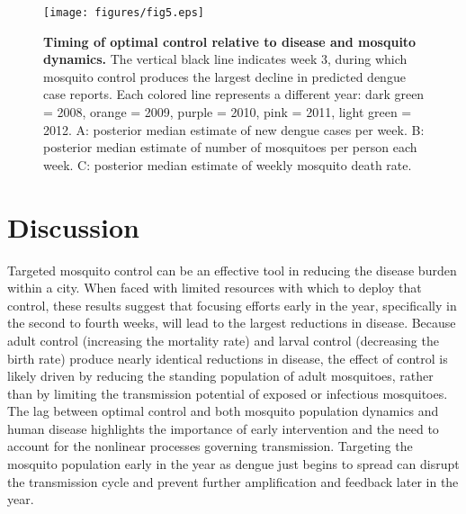 \documentclass[10pt,letterpaper]{article}
\begin{document}
\begin{figure}[!h]
\texttt{[image: figures/fig5.eps]}
\caption{{\bf Timing of optimal control relative to disease and mosquito dynamics.}
The vertical black line indicates week 3, during which mosquito control produces the largest decline in predicted dengue case reports. Each colored line represents a different year: dark green = 2008, orange = 2009, purple = 2010, pink = 2011, light green = 2012. A: posterior median estimate of new dengue cases per week. B: posterior median estimate of number of mosquitoes per person each week. C: posterior median estimate of weekly mosquito death rate.
}
\label{timing}
\end{figure}

\section*{Discussion}

Targeted mosquito control can be an effective tool in reducing the disease burden within a city.
When faced with limited resources with which to deploy that control, these results suggest that focusing efforts early in the year, specifically in the second to fourth weeks, will lead to the largest reductions in disease.
Because adult control (increasing the mortality rate) and larval control (decreasing the birth rate) produce nearly identical reductions in disease, the effect of control is likely driven by reducing the standing population of adult mosquitoes, rather than by limiting the transmission potential of exposed or infectious mosquitoes.
The lag between optimal control and both mosquito population dynamics and human disease highlights the importance of early intervention and the need to account for the nonlinear processes governing transmission.
Targeting the mosquito population early in the year as dengue just begins to spread can disrupt the transmission cycle and prevent further amplification and feedback later in the year.
\end{document}
